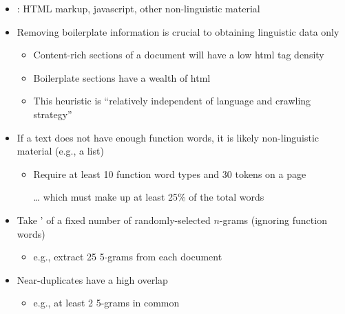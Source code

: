 \documentclass[a4paper,landscape,headrule,footrule,xetex]{foils}
\begin{document}
\begin{itemize}
\item {}: HTML markup, javascript, other non-linguistic
  material
\item Removing boilerplate information is crucial to obtaining
  linguistic data only
  \begin{itemize}
  \item Content-rich sections of a document will have a low 
    html tag density
  \item Boilerplate sections have a wealth of html
  \item This heuristic is ``relatively independent of language and
    crawling strategy''
  \end{itemize}
\item If a text does not have enough function words, it is likely
non-linguistic material (e.g., a list)
\begin{itemize}
\item Require at least 10 function word types and 30 tokens on a page
\item[\ldots]  which must make up at least 25\% of the total
words
\end{itemize}
\end{itemize}

\begin{itemize}
\item Take ' of a fixed number of randomly-selected $n$-grams (ignoring function words)
  \begin{itemize}
  \item e.g., extract 25 5-grams from each document
  \end{itemize}
\item Near-duplicates have a high overlap
 \begin{itemize}
 \item e.g., at least 2 5-grams in common
 \end{itemize}
\end{itemize}


\end{document}
